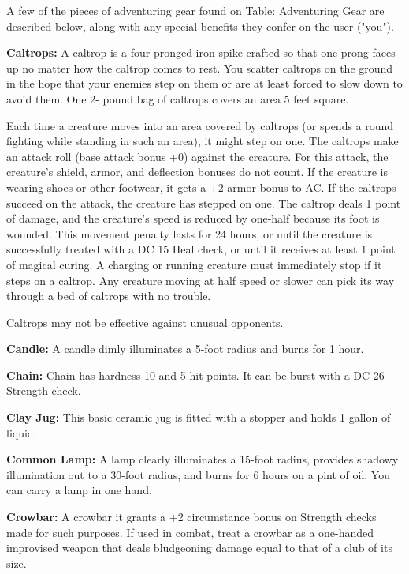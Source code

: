 \begin{multicols}{2}

A few of the pieces of adventuring gear found on Table: Adventuring Gear are described 
below, along with any special benefits they confer on the user ("you").

\textbf{Caltrops:} A caltrop is a four-pronged iron spike crafted so that one prong 
faces up no matter how the caltrop comes to rest. You scatter caltrops on the ground 
in the hope that your enemies step on them or are at least forced to slow down 
to avoid them. One 2- pound bag of caltrops covers an area 5 feet square.

Each time a creature moves into an area covered by caltrops (or spends a round 
fighting while standing in such an area), it might step on one. The caltrops make 
an attack roll (base attack bonus +0) against the creature. For this attack, the 
creature's shield, armor, and deflection bonuses do not count. If the creature 
is wearing shoes or other footwear, it gets a +2 armor bonus to AC. If the caltrops 
succeed on the attack, the creature has stepped on one. The caltrop deals 1 point 
of damage, and the creature's speed is reduced by one-half because its foot is 
wounded. This movement penalty lasts for 24 hours, or until the creature is successfully 
treated with a DC 15 Heal check, or until it receives at least 1 point of magical 
curing. A charging or running creature must immediately stop if it steps on a caltrop. 
Any creature moving at half speed or slower can pick its way through a bed of caltrops 
with no trouble.

Caltrops may not be effective against unusual opponents.

\textbf{Candle:} A candle dimly illuminates a 5-foot radius and burns for 1 hour.

\textbf{Chain:} Chain has hardness 10 and 5 hit points. It can be burst with a 
DC 26 Strength check.

\textbf{Clay Jug:} This basic ceramic jug is fitted with a stopper and holds 1 gallon of liquid.

\textbf{Common Lamp:} A lamp clearly illuminates a 15-foot radius, provides shadowy 
illumination out to a 30-foot radius, and burns for 6 hours on a pint of oil. You 
can carry a lamp in one hand. 

\textbf{Crowbar:} A crowbar it grants a +2 circumstance bonus on Strength checks 
made for such purposes. If used in combat, treat a crowbar as a one-handed improvised 
weapon that deals bludgeoning damage equal to that of a club of its size.


\end{multicols}

